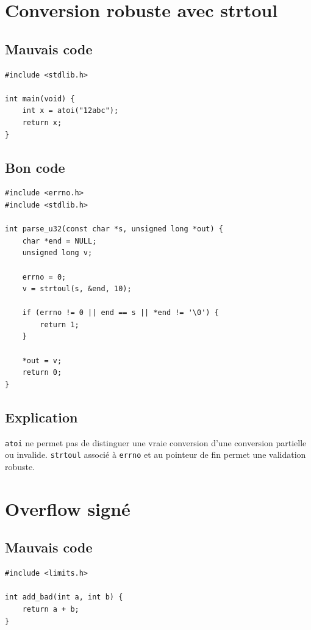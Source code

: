 \documentclass[a4paper,11pt]{report}
\begin{document}
\chapter{Conversion robuste avec strtoul}

\section{Mauvais code}
\begin{lstlisting}
#include <stdlib.h>

int main(void) {
    int x = atoi("12abc");
    return x;
}
\end{lstlisting}

\section{Bon code}
\begin{lstlisting}
#include <errno.h>
#include <stdlib.h>

int parse_u32(const char *s, unsigned long *out) {
    char *end = NULL;
    unsigned long v;

    errno = 0;
    v = strtoul(s, &end, 10);

    if (errno != 0 || end == s || *end != '\0') {
        return 1;
    }

    *out = v;
    return 0;
}
\end{lstlisting}

\section{Explication}
\texttt{atoi} ne permet pas de distinguer une vraie conversion d'une conversion partielle ou invalide.
\texttt{strtoul} associé à \texttt{errno} et au pointeur de fin permet une validation robuste.

\chapter{Overflow signé}

\section{Mauvais code}
\begin{lstlisting}
#include <limits.h>

int add_bad(int a, int b) {
    return a + b;
}
\end{lstlisting}
\end{document}
